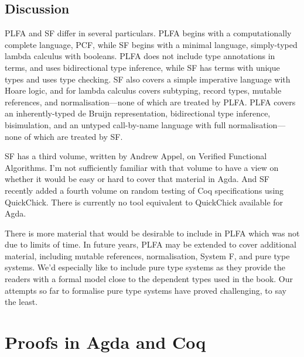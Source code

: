 \documentclass[preprint,authoryear]{elsarticle}
\begin{document}
\subsection*{Discussion}

PLFA and SF differ in several particulars.  PLFA begins with a computationally
complete language, PCF, while SF begins with a minimal language, simply-typed
lambda calculus with booleans.  PLFA does not include type annotations in terms,
and uses bidirectional type inference, while SF has terms with unique types and
uses type checking.  SF also covers a simple imperative language with Hoare
logic, and for lambda calculus covers subtyping, record types, mutable
references, and normalisation---none of which are treated by PLFA.  PLFA covers
an inherently-typed de Bruijn representation, bidirectional type inference,
bisimulation, and an untyped call-by-name language with full
normalisation---none of which are treated by SF. 

SF has a third volume, written by Andrew Appel, on Verified Functional
Algorithms. I'm not sufficiently familiar with that volume to have a view on
whether it would be easy or hard to cover that material in Agda. And SF recently
added a fourth volume on random testing of Coq specifications using QuickChick.
There is currently no tool equivalent to QuickChick available for Agda.


There is more material that would be desirable to include in PLFA which was not
due to limits of time.  In future years, PLFA may be extended to cover
additional material, including mutable references, normalisation, System F, and
pure type systems. We'd especially like to include pure type systems as they
provide the readers with a formal model close to the dependent types used in the
book.  Our attempts so far to formalise pure type systems have proved
challenging, to say the least.

\section{Proofs in Agda and Coq}
\end{document}
